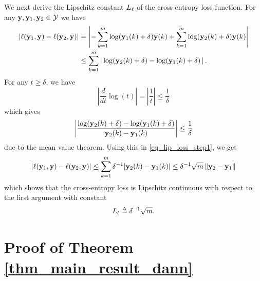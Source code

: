 \documentclass[review,supplement,onefignum,onetabnum]{siamonline250211}
\begin{document}
We next derive the Lipschitz constant $L_\ell$ of the cross-entropy loss function. For any $\mathbf{y}, \mathbf{y}_1, \mathbf{y}_2 \in \mathcal{Y}$ we have
%
\begin{equation}
\label{eq_lip_loss_step1}
\begin{split}
| \ell(\mathbf{y}_1, \mathbf{y}) -  \ell(\mathbf{y}_2, \mathbf{y}) |
&= \left |   -\sum_{k=1}^m  \log( \mathbf{y}_1(k) + \delta) \mathbf{y}(k)    
 + \sum_{k=1}^m  \log( \mathbf{y}_2(k) + \delta) \mathbf{y}(k)   \right|  \\
 &\leq \sum_{k=1}^m \left |  \, \log( \mathbf{y}_2(k) + \delta)  -   \log( \mathbf{y}_1(k) + \delta)  \, \right |.
\end{split}
\end{equation}
%
For any $t\geq \delta$, we have
%
\[
\left |  \frac{d}{dt} \log(t)   \right | = \left |  \frac{1}{t}   \right | 
\leq \frac{1}{\delta} 
\]
%
which gives
%
\begin{equation*}
\begin{split}
 \left|  \frac{  \log( \mathbf{y}_2(k) + \delta)  -   \log( \mathbf{y}_1(k) + \delta) }{\mathbf{y}_2(k) - \mathbf{y}_1(k)} \right |
 \leq  \frac{1}{\delta} 
\end{split}
\end{equation*}
%
due to the mean value theorem. Using this in \eqref{eq_lip_loss_step1}, we get
%
\begin{equation*}
\begin{split}
| \ell(\mathbf{y}_1, \mathbf{y}) -  \ell(\mathbf{y}_2, \mathbf{y}) |
 \leq \sum_{k=1}^m  \delta^{-1}  |  \mathbf{y}_2(k) - \mathbf{y}_1(k) |  
 \leq \delta^{-1} \sqrt{m} \, \|  \mathbf{y}_2 - \mathbf{y}_1 \|
\end{split}
\end{equation*}
%
which shows that the cross-entropy loss is Lipschitz continuous with respect to the first argument with constant
%
\[
L_\ell \triangleq \delta^{-1} \sqrt{m} .
\]


\section{Proof of Theorem \ref{thm_main_result_dann}}
\label{pf_thm_main_result_dann}
\end{document}
